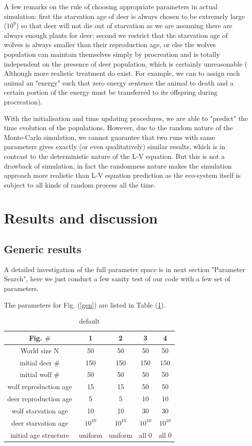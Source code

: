 \documentclass[a4paper,12pt]{article}
\begin{document}
A few remarks on the rule of choosing appropriate parameters in actual simulation: first the starvation age of deer is always chosen to be extremely large ($10^9$) so that deer will not die out of starvation as we are assuming there are always enough plants for deer; second we restrict that the starvation age of wolves is always smaller than their reproduction age, or else the wolves population can maintain themselves simply by procreation and is totally independent on the presence of deer population, which is certainly unreasonable ( Although more realistic treatment do exist. For example, we can to assign each animal an "energy" such that zero energy sentence the animal to death and a certain portion of the energy must be transferred to its offspring during procreation). 

With the initialisation and time updating procedures, we are able to "predict" the time evolution of the populations. However, due to the random nature of the Monte-Carlo simulation, we cannot guarantee that two runs with same parameters gives exactly (or even qualitatively) similar results, which is in contrast to the deterministic nature of the L-V equation. But this is not a drawback of simulation, in fact the randomness nature makes the simulation approach more realistic than L-V equation prediction as the eco-system itself is subject to all kinds of random process all the time.

\section{Results and discussion}
\subsection{Generic results}
A detailed investigation of the full parameter space is in next section "Parameter Search", here we just conduct a few sanity test of our code with a few set of parameters.

The parameters for Fig. (\ref{gen}) are listed in Table (\ref{Few_parameters}).
\begin{table}[htdp]
\caption{default}
\begin{center}
\begin{tabular}{c|cccc}
\hline
Fig. $\#$ 			&	1	&	2	&	3	&	4	\\
\hline
World size N		&	50	&	50	&	50	&	50	\\
initial deer $\#$ 	&	150	&	150	&	150	&	150	\\
initial wolf $\#$ 		&	50	&	50	&	50	&	50	\\
wolf reproduction age&	15	&	15	&	50	&	50	\\
deer reproduction age&	5	&	5	&	10	&	10	\\
wolf starvation age 	&	10	&	10	&	30	&	30	\\
deer starvation age	&	$10^{10}$	&	$10^{10}$	&	$10^{10}$	&	$10^{10}$	\\
initial age structure	&	uniform	&	uniform	&	all 0	&	all 0	\\		
\hline
\end{tabular}
\end{center}
\label{Few_parameters}
\end{table}
\end{document}
